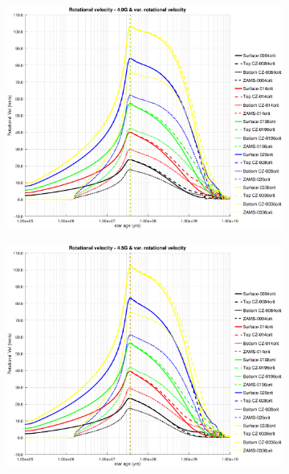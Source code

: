 \documentclass[fleqn,usenatbib]{mnras}
\begin{document}
\begin{figure}
    \begin{subfigure}[h]{0.47\textwidth}
    \includegraphics[trim = 30mm 15mm 20mm 15mm, clip,width=\textwidth]{figures/rot_vel_var_vel_4_0g.eps}
    \label{fig:subim43}
    \end{subfigure}
    \begin{subfigure}[h]{0.47\textwidth}
    \includegraphics[trim = 30mm 15mm 20mm 15mm, clip,width=\textwidth]{figures/rot_vel_var_vel_4_5g.eps}
    \label{fig:subim44}
    \end{subfigure}
    \begin{subfigure}[h]{0.47\textwidth}

\end{subfigure}
\end{figure}
\end{document}
